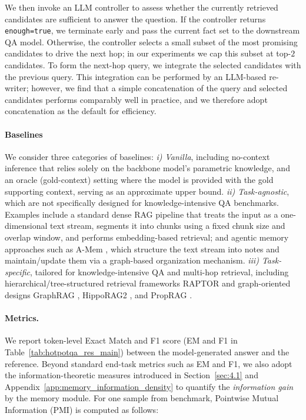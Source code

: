 We then invoke an LLM controller to assess whether the currently retrieved candidates are sufficient to answer the question. If the controller returns \texttt{enough=true}, we terminate early and pass the current fact set to the downstream QA model. Otherwise, the controller selects a small subset of the most promising candidates to drive the next hop; in our experiments we cap this subset at top-$2$ candidates. To form the next-hop query, we integrate the selected candidates with the previous query. This integration can be performed by an LLM-based re-writer; however, we find that a simple concatenation of the query and selected candidates performs comparably well in practice, and we therefore adopt concatenation as the default for efficiency.


\paragraph{Baselines} 

We consider three categories of baselines:
\textit{i) Vanilla}, including no-context inference that relies solely on the backbone model’s parametric knowledge, and an oracle (gold-context) setting where the model is provided with the gold supporting context, serving as an approximate upper bound. \textit{ii) Task-agnostic}, which are not specifically designed for knowledge-intensive QA benchmarks. Examples include a standard dense RAG pipeline that treats the input as a one-dimensional text stream, segments it into chunks using a fixed chunk size and overlap window, and performs embedding-based retrieval; and agentic memory approaches such as A-Mem \citep{xu2025amemagenticmemoryllm}, which structure the text stream into notes and maintain/update them via a graph-based organization mechanism. \textit{iii) Task-specific}, tailored for knowledge-intensive QA and multi-hop retrieval, including hierarchical/tree-structured retrieval frameworks RAPTOR \citep{sarthi2024raptorrecursiveabstractiveprocessing} and graph-oriented designs GraphRAG \citep{edge2025localglobalgraphrag}, HippoRAG2 \citep{gutiérrez2025ragmemorynonparametriccontinual}, and PropRAG \citep{Wang_2025}.


\paragraph{Metrics.} 
We report token-level Exact Match and F1 score (EM and F1 in Table~\ref{tab:hotpotqa_res_main}) between the model-generated answer and the reference. Beyond standard end-task metrics such as EM and F1, we also adopt the information-theoretic measures introduced in Section~\ref{sec:4.1} and Appendix~\ref{app:memory_information_density} to quantify the \emph{information gain} by the memory module. For one sample from benchmark, Pointwise Mutual Information (PMI) is computed as follows:

